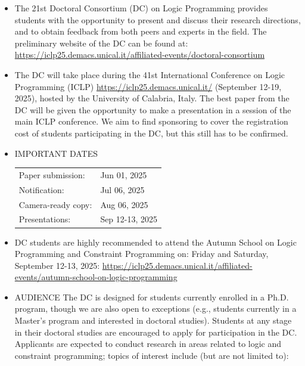 \documentclass[prodmode,acmtecs]{acmsmall} %
\begin{document}
\begin{itemize}\item  The 21st Doctoral Consortium (DC) on Logic Programming provides students with the opportunity to present and discuss their research directions, and to obtain feedback from both peers and experts in the field. The preliminary website of the DC can be found at: \href{https://iclp25.demacs.unical.it/affiliated-events/doctoral-consortium}{https://iclp25.demacs.unical.it/affiliated-events/doctoral-consortium} 
 
\item  The DC will take place during the 41st International Conference on Logic Programming (ICLP) \href{https://iclp25.demacs.unical.it/}{https://iclp25.demacs.unical.it/} (September 12-19, 2025), hosted by the University of Calabria, Italy. The best paper from the DC will be given the opportunity to make a presentation in a session of the main ICLP conference. We aim to find sponsoring to cover the registration cost of students participating in the DC, but this still has to be confirmed. 
 
\item  IMPORTANT DATES 
 
\begin{tabulary}{\linewidth}{LL}Paper submission:  & Jun 01, 2025 \\
Notification:  & Jul 06, 2025 \\
Camera-ready copy:  & Aug 06, 2025 \\
Presentations:  & Sep 12-13, 2025 \\
\end{tabulary}
 
\item  DC students are highly recommended to attend the Autumn School on Logic Programming and Constraint Programming on: Friday and Saturday, September 12-13, 2025: \href{https://iclp25.demacs.unical.it/affiliated-events/autumn-school-on-logic-programming}{https://iclp25.demacs.unical.it/affiliated-events/autumn-school-on-logic-programming} 
 
\item  AUDIENCE The DC is designed for students currently enrolled in a Ph.D. program, though we are also open to exceptions (e.g., students currently in a Master's program and interested in doctoral studies). Students at any stage in their doctoral studies are encouraged to apply for participation in the DC. Applicants are expected to conduct research in areas related to logic and constraint programming; topics of interest include (but are not limited to): 
 

\end{itemize}
\end{document}
